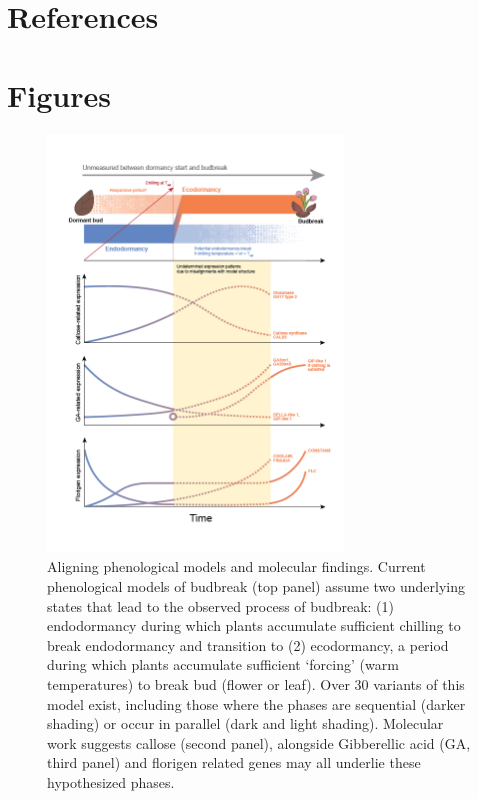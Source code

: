 \documentclass[11pt]{article}
\begin{document}
\clearpage

\section{References}



\clearpage
\section{Figures}

\begin{figure}[h!]
\includegraphics[width=0.7\textwidth]{..//figures/conceptModel/combinedModel.png}
\caption{Aligning phenological models and molecular findings. Current phenological models of budbreak (top panel) assume two underlying states that lead to the observed process of budbreak: (1) endodormancy during which plants accumulate sufficient chilling to break endodormancy and transition to (2) ecodormancy, a period during which plants accumulate sufficient `forcing' (warm temperatures) to break bud (flower or leaf). Over 30 variants of this model exist, including those where the phases are sequential (darker shading) or occur in parallel (dark and light shading). Molecular work suggests callose (second panel), alongside Gibberellic acid (GA, third panel) and florigen related genes may all underlie these hypothesized phases.} 
\label{fig:modelsketch}
\end{figure}
\end{document}
